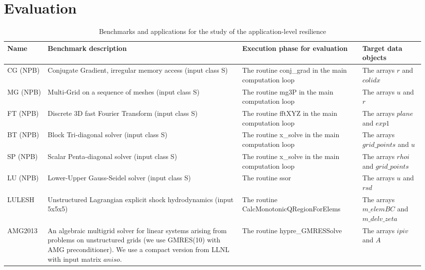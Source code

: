 \section{Evaluation}
\label{sec:evaluation}
\begin{table*}[!t]
\begin{center}
\caption {Benchmarks and applications for the study of the application-level resilience}
\vspace{-5pt}
\label{tab:benchmark}
\tiny
\begin{tabular}{|p{1.7cm}|p{7.5cm}|p{4cm}|p{2.5cm}|}
\hline
\textbf{Name} 	& \textbf{Benchmark description} 		& \textbf{Execution phase for evaluation}  			& \textbf{Target data objects}             \\ \hline \hline
CG (NPB)             & Conjugate Gradient, irregular memory access (input class S)   & The routine conj\_grad in the main computation loop  & The arrays $r$ and $colidx$     \\\hline
MG (NPB)    	       & Multi-Grid on a sequence of meshes (input class S)             & The routine mg3P in the main computation loop & The arrays $u$ and $r$ 	\\ \hline
FT (NPB)             & Discrete 3D fast Fourier Transform (input class S)            & The routine fftXYZ in the main computation loop  & The arrays $plane$ and $exp1$    \\ \hline
BT (NPB)             & Block Tri-diagonal solver (input class S)         		& The routine x\_solve in the main computation loop & The arrays $grid\_points$ and $u$	\\ \hline
SP (NPB)             & Scalar Penta-diagonal solver (input class S)         		& The routine x\_solve in the main computation loop & The arrays $rhoi$ and $grid\_points$  \\ \hline
LU (NPB)            & Lower-Upper Gauss-Seidel solver (input class S)        	& The routine ssor 	& The arrays $u$ and $rsd$ \\ \hline \hline
LULESH~\cite{IPDPS13:LULESH} & Unstructured Lagrangian explicit shock hydrodynamics (input 5x5x5) & 
The routine CalcMonotonicQRegionForElems 
& The arrays $m\_elemBC$ and $m\_delv\_zeta$ \\ \hline
AMG2013~\cite{anm02:amg} & An algebraic multigrid solver for linear systems arising from problems on unstructured grids (we use  GMRES(10) with AMG preconditioner). We use a compact version from LLNL with input matrix $aniso$. & The routine hypre\_GMRESSolve & The arrays $ipiv$ and $A$   \\ \hline
\end{tabular}
\end{center}
\vspace{-5pt}
\end{table*}

